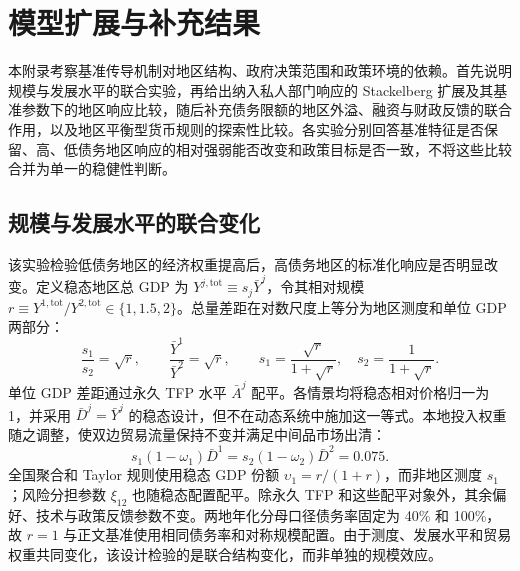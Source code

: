 \documentclass[12pt,UTF8]{ctexart}
\begin{document}
	\section{模型扩展与补充结果}
	
	本附录考察基准传导机制对地区结构、政府决策范围和政策环境的依赖。首先说明规模与发展水平的联合实验，再给出纳入私人部门响应的 Stackelberg 扩展及其基准参数下的地区响应比较，随后补充债务限额的地区外溢、融资与财政反馈的联合作用，以及地区平衡型货币规则的探索性比较。各实验分别回答基准特征是否保留、高、低债务地区响应的相对强弱能否改变和政策目标是否一致，不将这些比较合并为单一的稳健性判断。
	
	\subsection{规模与发展水平的联合变化}
	\label{app:scale_development}
	
	该实验检验低债务地区的经济权重提高后，高债务地区的标准化响应是否明显改变。定义稳态地区总 GDP 为 $Y^{j,\mathrm{tot}}\equiv s_j\bar Y^j$，令其相对规模 $r\equiv Y^{1,\mathrm{tot}}/Y^{2,\mathrm{tot}}\in\{1,1.5,2\}$。总量差距在对数尺度上等分为地区测度和单位 GDP 两部分：
	\begin{equation}
		\frac{s_1}{s_2}=\sqrt r,\qquad
		\frac{\bar Y^1}{\bar Y^2}=\sqrt r,\qquad
		s_1=\frac{\sqrt r}{1+\sqrt r},\quad s_2=\frac{1}{1+\sqrt r}.
		\label{eq:scale_development_design}
	\end{equation}
	单位 GDP 差距通过永久 TFP 水平 $\bar A^j$ 配平。各情景均将稳态相对价格归一为 1，并采用 $\bar D^j=\bar Y^j$ 的稳态设计，但不在动态系统中施加这一等式。本地投入权重随之调整，使双边贸易流量保持不变并满足中间品市场出清：
	\[
	s_1(1-\omega_1)\bar D^1=s_2(1-\omega_2)\bar D^2=0.075.
	\]
	全国聚合和 Taylor 规则使用稳态 GDP 份额 $\upsilon_1=r/(1+r)$，而非地区测度 $s_1$；风险分担参数 $\xi_{12}$ 也随稳态配置配平。除永久 TFP 和这些配平对象外，其余偏好、技术与政策反馈参数不变。两地年化分母口径债务率固定为 40\% 和 100\%，故 $r=1$ 与正文基准使用相同债务率和对称规模配置。由于测度、发展水平和贸易权重共同变化，该设计检验的是联合结构变化，而非单独的规模效应。
	
\end{document}
